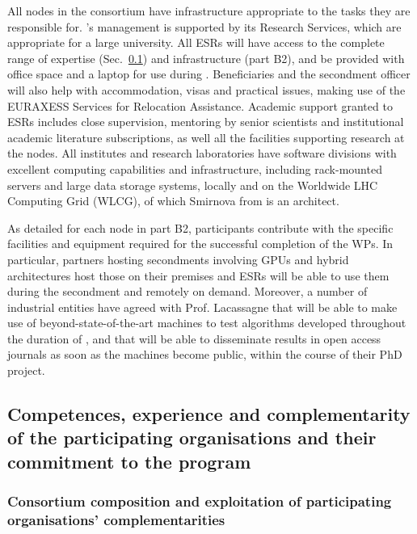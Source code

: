 %
All nodes in the consortium have infrastructure appropriate to the tasks
they are responsible for. \lundentity's management is supported by its Research Services, 
which are appropriate for a large university. 
All ESRs will have access to the complete range of \acronym
expertise (Sec.~\ref{ss:competence_44}) and infrastructure (part B2),
and be provided with office space and a laptop for use during \acronym. 
Beneficiaries and the secondment officer will also help with accommodation,
visas and practical issues, making use of the EURAXESS Services for Relocation Assistance. 
Academic support granted to ESRs includes close supervision, mentoring by senior scientists and 
institutional academic literature subscriptions, as well all the facilities supporting research at the nodes. 
All institutes and research laboratories have software divisions with excellent computing
capabilities and infrastructure, including rack-mounted
servers and large data storage systems, locally and on the Worldwide LHC Computing Grid (WLCG),
of which Smirnova from \lundentity is an architect.

As detailed for each node in part B2, \acronym participants
contribute with the specific facilities and equipment required for the successful completion of the WPs.
In particular, partners hosting secondments involving GPUs and hybrid architectures host those on their premises
and ESRs will be able to use them during the secondment and remotely on demand. 
Moreover, a number of industrial entities have agreed with Prof. Lacassagne that \ESRg
will be able to make use of beyond-state-of-the-art machines to test algorithms developed
throughout the duration of \acronym, and that \ESRg will
be able to disseminate results in open access journals as soon as
the machines become public, within the course of their PhD project. 

\subsection{Competences, experience and complementarity of the participating organisations and their commitment to the program}
\label{ss:competence_44}

\subsubsection{Consortium composition and exploitation of participating organisations' complementarities}
\label{sub:composition}

